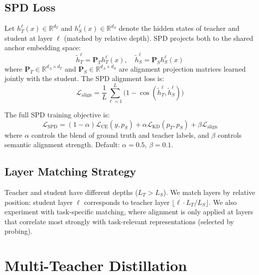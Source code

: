\documentclass[11pt,a4paper]{article}
\begin{document}
\subsection{SPD Loss}

Let $h_T^\ell(x) \in \mathbb{R}^{d_T}$ and $h_S^\ell(x) \in \mathbb{R}^{d_S}$ denote
the hidden states of teacher and student at layer $\ell$ (matched by relative depth).
SPD projects both to the shared anchor embedding space:
\begin{equation}
    \tilde{h}_T^\ell = \mathbf{P}_T h_T^\ell(x), \quad
    \tilde{h}_S^\ell = \mathbf{P}_S h_S^\ell(x)
    \label{eq:projection}
\end{equation}
where $\mathbf{P}_T \in \mathbb{R}^{d_A \times d_T}$ and
$\mathbf{P}_S \in \mathbb{R}^{d_A \times d_S}$ are alignment projection matrices
learned jointly with the student. The SPD alignment loss is:
\begin{equation}
    \mathcal{L}_{\text{align}} = \frac{1}{L}\sum_{\ell=1}^{L}
    \bigl(1 - \cos(\tilde{h}_T^\ell, \tilde{h}_S^\ell)\bigr)
    \label{eq:align_loss}
\end{equation}

The full SPD training objective is:
\begin{equation}
    \mathcal{L}_{\text{SPD}} = (1-\alpha)\mathcal{L}_{\text{CE}}(y, p_S)
    + \alpha \mathcal{L}_{\text{KD}}(p_T, p_S)
    + \beta \mathcal{L}_{\text{align}}
    \label{eq:spd_total}
\end{equation}
where $\alpha$ controls the blend of ground truth and teacher labels, and $\beta$
controls semantic alignment strength. Default: $\alpha = 0.5$, $\beta = 0.1$.

\subsection{Layer Matching Strategy}

Teacher and student have different depths ($L_T > L_S$). We match layers by relative
position: student layer $\ell$ corresponds to teacher layer $\lfloor \ell \cdot L_T / L_S \rfloor$.
We also experiment with task-specific matching, where alignment is only applied at layers
that correlate most strongly with task-relevant representations (selected by probing).

\section{Multi-Teacher Distillation}
\label{sec:multi_teacher}
\end{document}
